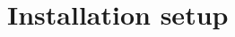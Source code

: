 \documentclass[../ATD.tex]{subfiles}
\begin{document}
    \chapter{Installation setup}\label{ch:installation-setup}
\end{document}

